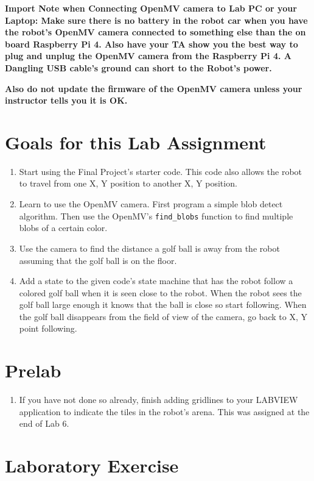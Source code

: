 \documentclass[11pt]{article}
\begin{document}
\MakeAssignmentTitle

\textbf{Import Note when Connecting OpenMV camera to Lab PC or your Laptop: Make sure there is no battery in the robot car when you have the robot’s OpenMV camera connected to something else than the on board Raspberry Pi 4. Also have your TA show you the best way to plug and unplug the OpenMV camera from the Raspberry Pi 4. A Dangling USB cable’s ground can short to the Robot’s power.}

\textbf{Also do not update the firmware of the OpenMV camera unless your instructor tells you it is OK.}

\section*{Goals for this Lab Assignment}
%
\begin{enumerate}
    \item Start using the Final Project’s starter code.  This code also allows the robot to travel from one X, Y position to another X, Y position.
        \item Learn to use the OpenMV camera. First program a simple blob detect algorithm. Then use the OpenMV’s \texttt{find_blobs} function to find multiple blobs of a certain color.
    \item Use the camera to find the distance a golf ball is away from the robot assuming that the golf ball is on the floor.
    \item Add a state to the given code’s state machine that has the robot follow a colored golf ball when it is seen close to the robot. When the robot sees the golf ball large enough it knows that the ball is close so start following. When the golf ball disappears from the field of view of the camera, go back to X, Y point following.
\end{enumerate}
%
\section*{Prelab}
%
\begin{enumerate}
    \item If you have not done so already, finish adding gridlines to your LABVIEW application to indicate the tiles in the robot’s arena. This was assigned at the end of Lab 6.
\end{enumerate}
%
\section*{Laboratory Exercise}
\end{document}
